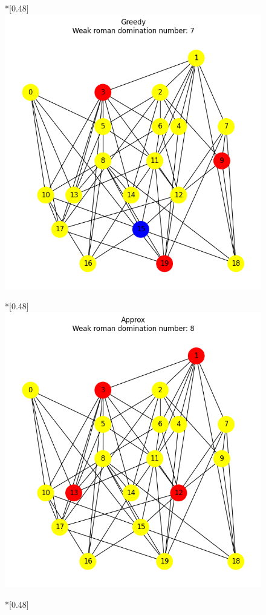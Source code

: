 \begin{figure}[H]
        \hfill
        \begin{subcaptionbox}*{}[0.48\linewidth]
            {\includegraphics[width=0.75\linewidth]{assets/plots/Greedy/ErdosRenyi_sparse_n20_i2_results.png}}
        \end{subcaptionbox}
        \hfill
        \begin{subcaptionbox}*{}[0.48\linewidth]
            {\includegraphics[width=0.75\linewidth]{assets/plots/Approx/ErdosRenyi_sparse_n20_i2_results.png}}
        \end{subcaptionbox}
        \hfill
        \begin{subcaptionbox}*{}[0.48\linewidth]

\end{subcaptionbox}
\end{figure}
